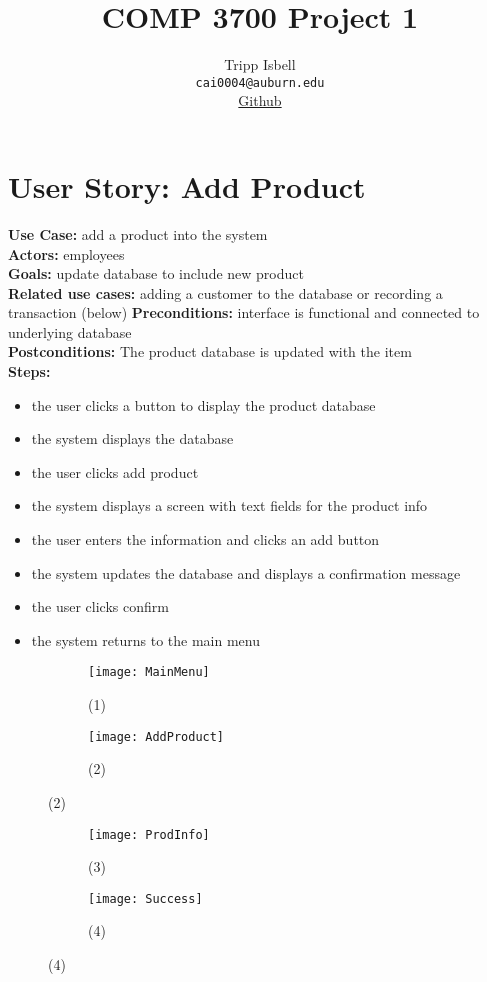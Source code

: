 \documentclass[notitlepage,11pt]{article}
\title{COMP 3700 Project 1}
\author{Tripp Isbell\\
	\texttt{cai0004@auburn.edu}\\
	\href{https://github.com/Carbonationalism/COMP3700/tree/master/activities/Project1}{Github}}
\date{}
\begin{document}
\maketitle

\section{User Story: Add Product}
\textbf{Use Case:} add a product into the system\\
	\textbf{Actors:} employees\\
	\textbf{Goals:} update database to include new product\\
	\textbf{Related use cases:} adding a customer to the database or recording a transaction (below)
	\textbf{Preconditions:} interface is functional and connected to underlying database\\
	\textbf{Postconditions:} The product database is updated with the item\\
	\textbf{Steps:}
		\begin{itemize}
		\item[(1)] the user clicks a button to display the product database
		\item[(2)] the system displays the database
		\item the user clicks add product
		\item[(3)] the system displays a screen with text fields for the product info
		\item the user enters the information and clicks an add button
		\item[(4)] the system updates the database and displays a confirmation message
		\item the user clicks confirm 
		\item[(1)] the system returns to the main menu
		\end{itemize}
\begin{figure}[h]
	\begin{subfigure}{.5\textwidth}
	\centering
	\texttt{[image: MainMenu]}
	\caption{(1)}
	\end{subfigure}%
	\begin{subfigure}{.5\textwidth}
	\centering
	\texttt{[image: AddProduct]}
	\caption{(2)}
	\end{subfigure}
\end{figure}
\begin{figure}[h]
	\begin{subfigure}{.5\textwidth}
	\centering
	\texttt{[image: ProdInfo]}
	\caption{(3)}
	\end{subfigure}%
	\begin{subfigure}{.5\textwidth}
	\centering
	\texttt{[image: Success]}
	\caption{(4)}
	\end{subfigure}
\end{figure}
\end{document}
